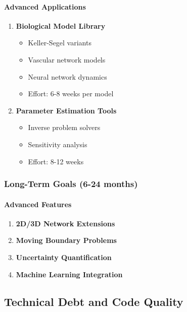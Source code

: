 \paragraph{Advanced Applications}
\begin{enumerate}
    \item \textbf{Biological Model Library}
    \begin{itemize}
        \item Keller-Segel variants
        \item Vascular network models
        \item Neural network dynamics
        \item Effort: 6-8 weeks per model
    \end{itemize}
    
    \item \textbf{Parameter Estimation Tools}
    \begin{itemize}
        \item Inverse problem solvers
        \item Sensitivity analysis
        \item Effort: 8-12 weeks
    \end{itemize}
\end{enumerate}

\subsubsection{Long-Term Goals (6-24 months)}

\paragraph{Advanced Features}
\begin{enumerate}
    \item \textbf{2D/3D Network Extensions}
    \item \textbf{Moving Boundary Problems}
    \item \textbf{Uncertainty Quantification}
    \item \textbf{Machine Learning Integration}
\end{enumerate}

\subsection{Technical Debt and Code Quality}

